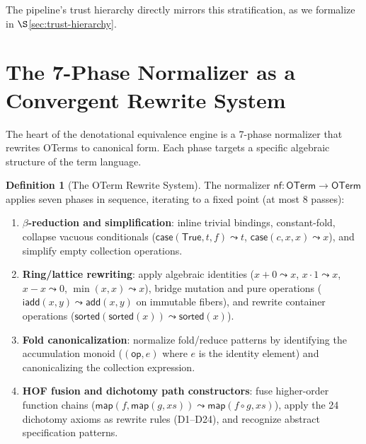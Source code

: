 \documentclass[11pt,a4paper]{report}
\theoremstyle{definition}
\newtheorem{definition}{Definition}[chapter]
\theoremstyle{plain}
\begin{document}
The pipeline's trust hierarchy directly mirrors this stratification,
as we formalize in $\S$\ref{sec:trust-hierarchy}.

\section{The 7-Phase Normalizer as a Convergent Rewrite System}
\label{sec:normalizer}

The heart of the denotational equivalence engine is a 7-phase
normalizer that rewrites OTerms to canonical form.  Each phase targets
a specific algebraic structure of the term language.

\begin{definition}[The OTerm Rewrite System]
\label{def:oterm-rws}
The normalizer $\mathsf{nf} : \mathsf{OTerm} \to \mathsf{OTerm}$
applies seven phases in sequence, iterating to a fixed point
(at most 8 passes):
\begin{enumerate}
  \item \textbf{$\beta$-reduction and simplification}: inline
    trivial bindings, constant-fold, collapse vacuous conditionals
    ($\mathsf{case}(\mathsf{True}, t, f) \leadsto t$,
    $\mathsf{case}(c, x, x) \leadsto x$), and simplify empty
    collection operations.

  \item \textbf{Ring/lattice rewriting}: apply algebraic identities
    ($x + 0 \leadsto x$, $x \cdot 1 \leadsto x$,
    $x - x \leadsto 0$, $\min(x,x) \leadsto x$),
    bridge mutation and pure operations
    ($\mathsf{iadd}(x,y) \leadsto \mathsf{add}(x,y)$ on immutable
    fibers), and rewrite container operations
    ($\mathsf{sorted}(\mathsf{sorted}(x)) \leadsto \mathsf{sorted}(x)$).

  \item \textbf{Fold canonicalization}: normalize fold/reduce
    patterns by identifying the accumulation monoid
    ($(\mathsf{op}, e)$ where $e$ is the identity element) and
    canonicalizing the collection expression.

  \item \textbf{HOF fusion and dichotomy path constructors}: fuse
    higher-order function chains
    ($\mathsf{map}(f, \mathsf{map}(g, xs)) \leadsto
    \mathsf{map}(f \circ g, xs)$),
    apply the 24 dichotomy axioms as rewrite rules (D1--D24), and
    recognize abstract specification patterns.


\end{enumerate}
\end{definition}
\end{document}
